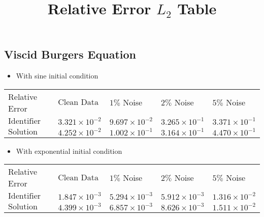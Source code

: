 \documentclass[12pt]{article}
\begin{document}
\title{Relative Error $L_{2}$ Table}
\author{}
\date{}

\maketitle

\subsection{Viscid Burgers Equation}

\begin{itemize}
    \item With sine initial condition 
\end{itemize}
	\tabulinesep=4mm
	{ \large  }
	\vspace{3mm}
	\begin{tabu} to \linewidth { | X[c] | X[c] | X[c] | X[c] | X[c] | }
		 \hline
		\everyrow{\hline}
		Relative Error	& $\text{Clean Data}$ & $1 \%$ Noise & $2 \%$ Noise & $5 \%$ Noise \\
		$\text{Identifier}$ & $3.321 \times 10^{-2}$  & $9.697 \times 10^{-2}$   & $3.265 \times 10^{-1}$  & $3.371 \times 10^{-1}$ \\
		$\text{Solution}$ & $4.252 \times 10^{-2}$ &  $1.002 \times 10^{-1}$ & $3.164 \times 10^{-1}$    &  $4.470 \times 10^{-1}$  \\
	\end{tabu}




\begin{itemize}
    \item With exponential initial condition 
\end{itemize}
	\tabulinesep=4mm
	{ \large  }
	\vspace{3mm}
	\begin{tabu} to \linewidth { | X[c] | X[c] | X[c] | X[c] | X[c] | }
		 \hline
		\everyrow{\hline}
		Relative Error	& $\text{Clean Data}$ & $1 \%$ Noise & $2 \%$ Noise & $5 \%$ Noise \\
		$\text{Identifier}$ & $1.847 \times 10^{-3}$  & $5.294 \times 10^{-3}$   & $5.912 \times 10^{-3}$  & $1.316 \times 10^{-2}$ \\
		$\text{Solution}$ & $4.399 \times 10^{-3}$ &  $6.857 \times 10^{-3}$ & $8.626 \times 10^{-3}$    &  $1.511 \times 10^{-2}$  \\
	\end{tabu}
\end{document}
